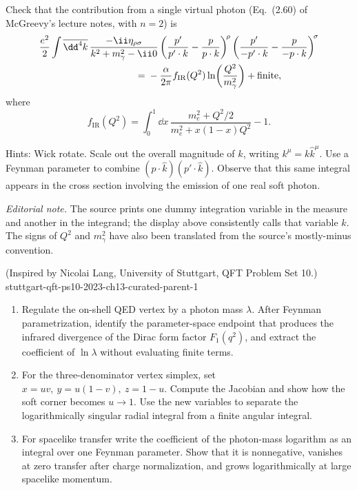 \begin{enumerate}
Check that the contribution from a single virtual photon (Eq.~(2.60) of
McGreevy's lecture notes, with \(n=2\)) is
\[
 \begin{split}
 &\frac{e^2}{2}\int\overline{\dd^4k}\,
 \frac{-\ii\eta_{\rho\sigma}}{k^2+m_\gamma^2-\ii0}
 \left(\frac{p'}{p'\cdot k}-\frac{p}{p\cdot k}\right)^{\!\rho}
 \left(\frac{p'}{-p'\cdot k}-\frac{p}{-p\cdot k}\right)^{\!\sigma}
 \\
 &\hspace{35mm}={}-\frac{\alpha}{2\pi}f_{\mathrm{IR}}(Q^2)
 \ln\!\left(\frac{Q^2}{m_\gamma^2}\right)+\text{finite},
 \end{split}
\]
where
\[
 f_{\mathrm{IR}}(Q^2)=\int_0^1\dd x\,
 \frac{m_e^2+Q^2/2}{m_e^2+x(1-x)Q^2}-1.
\]

Hints: Wick rotate.  Scale out the overall magnitude of \(k\), writing
\(k^\mu=k\widehat k^\mu\).  Use a Feynman parameter to combine
\((p\cdot\widehat k)(p'\cdot\widehat k)\).  Observe that this same
integral appears in the cross section involving the emission of one real
soft photon.

\emph{Editorial note.}  The source prints one dummy integration variable
in the measure and another in the integrand; the display above consistently
calls that variable \(k\).  The signs of \(Q^2\) and \(m_\gamma^2\) have
also been translated from the source's mostly-minus convention.

  {(Inspired by Nicolai Lang, University of Stuttgart, QFT Problem Set 10.)}
  {stuttgart-qft-ps10-2023-ch13-curated-parent-1}
\begin{enumerate}
\item
Regulate the on-shell QED vertex by a photon mass \(\lambda\).  After
Feynman parametrization, identify the parameter-space endpoint that
produces the infrared divergence of the Dirac form factor \(F_1(q^2)\), and
extract the coefficient of \(\ln\lambda\) without evaluating finite terms.
\item
For the three-denominator vertex simplex, set
\(x=uv,\ y=u(1-v),\ z=1-u\).  Compute the Jacobian and show how the soft
corner becomes \(u\to1\).  Use the new variables to separate the
logarithmically singular radial integral from a finite angular integral.
\item
For spacelike transfer write the coefficient of the photon-mass logarithm
as an integral over one Feynman parameter.  Show that it is nonnegative,
vanishes at zero transfer after charge normalization, and grows
logarithmically at large spacelike momentum.
\end{enumerate}


\end{enumerate}
